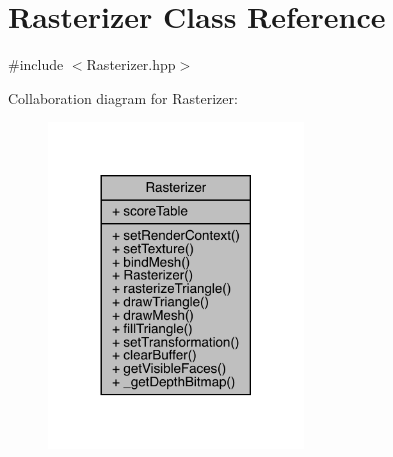 \hypertarget{class_rasterizer}{}\section{Rasterizer Class Reference}
\label{class_rasterizer}


{\ttfamily \#include $<$Rasterizer.\+hpp$>$}



Collaboration diagram for Rasterizer\+:\nopagebreak
\begin{figure}[H]
\begin{center}
\leavevmode
\includegraphics[width=192pt]{class_rasterizer__coll__graph}
\end{center}
\end{figure}

